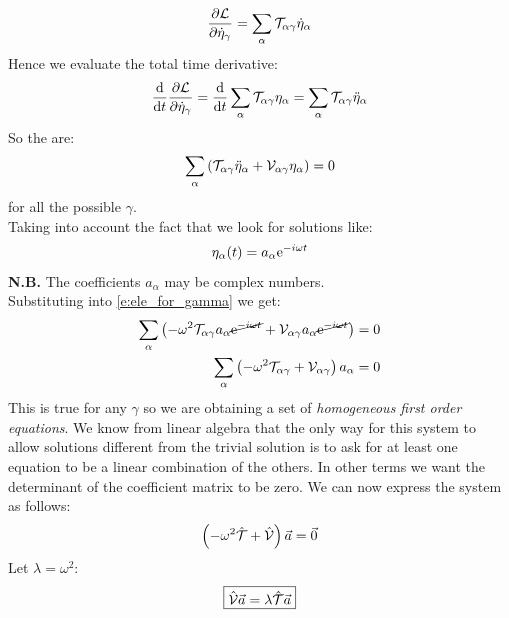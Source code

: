 \begin{equation}
    \dfrac{\partial \mathcal{L}}{\partial \dot{\eta}_{\gamma}} = \displaystyle\sum_{\alpha}\mathcal{T}_{\alpha \gamma} \dot{\eta}_{\alpha}
\end{equation}
Hence we evaluate the total time derivative:
\begin{equation}
    \dfrac{\mathrm{d} }{\mathrm{d}t}\dfrac{\partial \mathcal{L}}{\partial \dot{\eta}_{\gamma}} = \dfrac{\mathrm{d} }{\mathrm{d}t}\displaystyle\sum_{\alpha}\mathcal{T}_{\alpha \gamma} \eta_{\alpha} = \displaystyle\sum_{\alpha}\mathcal{T}_{\alpha \gamma} \ddot{\eta}_{\alpha}
\end{equation}
So the \eleref\;are:
\begin{equation} \label{e:ele_for_gamma}
    \displaystyle\sum_{\alpha}\left(\mathcal{T}_{\alpha \gamma} \ddot{\eta}_{\alpha} + \mathcal{V}_{\alpha \gamma} \eta_{\alpha}\right) = 0
\end{equation}
for all the possible $\gamma$.\\
Taking into account the fact that we look for solutions like:
\begin{equation}
    \eta_{\alpha} (t) = a_{\alpha}\mathrm{e}^{-i\omega t}
\end{equation}
\textbf{N.B.} The coefficients $a_{\alpha}$ may be complex numbers.\\
Substituting into \eqref{e:ele_for_gamma} we get:
\begin{equation} \label{e:eigenvalue_alpha}
    \begin{split}
        \displaystyle\sum_{\alpha}\left(-\omega^2\mathcal{T}_{\alpha \gamma} a_{\alpha}\cancel{\mathrm{e}^{-i\omega t}} + \mathcal{V}_{\alpha \gamma}a_{\alpha}\cancel{\mathrm{e}^{-i\omega t}}\right) &= 0\\
        \displaystyle\sum_{\alpha}\left(-\omega^2\mathcal{T}_{\alpha \gamma} + \mathcal{V}_{\alpha \gamma}\right)a_{\alpha} &= 0
    \end{split}
\end{equation}
This is true for any $\gamma$ so we are obtaining a set of \textit{homogeneous first order equations}. We know from linear algebra that the only way for this system to allow solutions different from the trivial solution is to ask for at least one equation to be a linear combination of the others.
In other terms we want the determinant of the coefficient matrix to be zero. We can now express the system as follows:
\begin{equation}
    \left(-\omega^2\hat{\mathcal{T}} + \hat{\mathcal{V}}\right)\vec{a} = \vec{0}
\end{equation}
Let $\lambda = \omega^2$:
\begin{equation}
    \boxed{\hat{\mathcal{V}}\vec{a} = \lambda\hat{\mathcal{T}}\vec{a}}
\end{equation}
